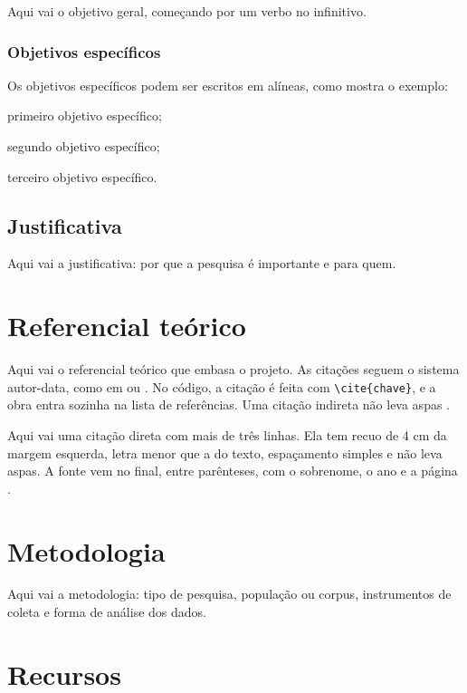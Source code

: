 \documentclass[12pt,a4paper,oneside]{article}
\begin{document}
Aqui vai o objetivo geral, começando por um verbo no infinitivo.

\subsubsection{Objetivos específicos}

Os objetivos específicos podem ser escritos em alíneas, como mostra o exemplo:
\begin{alineas}
  \item primeiro objetivo específico;
  \item segundo objetivo específico;
  \item terceiro objetivo específico.
\end{alineas}

\subsection{Justificativa}

Aqui vai a justificativa: por que a pesquisa é importante e para quem.

\section{Referencial teórico}

Aqui vai o referencial teórico que embasa o projeto. As citações seguem o sistema autor-data, como em \cite[p.~15]{livro2024} ou . No código, a citação é feita com \texttt{\textbackslash cite\{chave\}}, e a obra entra sozinha na lista de referências. Uma citação indireta não leva aspas \cite{artigo2025,dissertacao2021}.

\begin{citacao}
Aqui vai uma citação direta com mais de três linhas. Ela tem recuo de 4 cm da margem esquerda, letra menor que a do texto, espaçamento simples e não leva aspas. A fonte vem no final, entre parênteses, com o sobrenome, o ano e a página \cite[p.~47]{capitulo2023}.
\end{citacao}

\section{Metodologia}

Aqui vai a metodologia: tipo de pesquisa, população ou corpus, instrumentos de coleta e forma de análise dos dados.

\section{Recursos}
\end{document}
